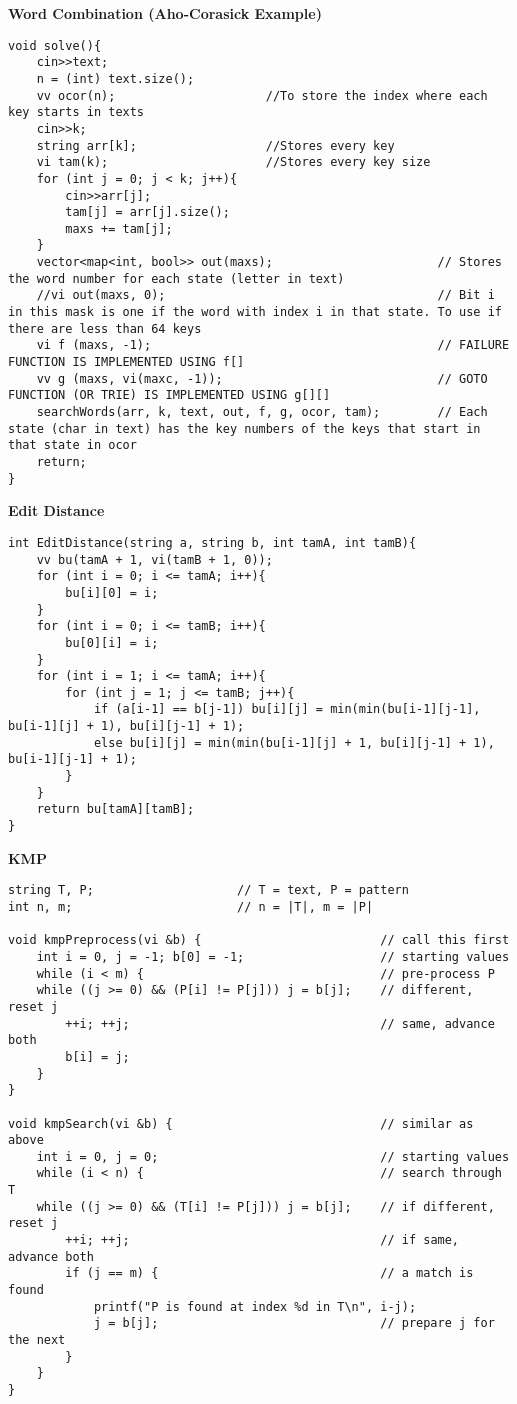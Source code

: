\documentclass{article}
\begin{document}
\begin{multicols}{2}
\large
\huge\textbf{Word Combination (Aho-Corasick Example)}
\large
\begin{lstlisting}
void solve(){
	cin>>text;
	n = (int) text.size();
	vv ocor(n);                     //To store the index where each key starts in texts
	cin>>k;
	string arr[k];                  //Stores every key
	vi tam(k);                      //Stores every key size
	for (int j = 0; j < k; j++){
		cin>>arr[j];
		tam[j] = arr[j].size();
		maxs += tam[j];
	}
	vector<map<int, bool>> out(maxs);                       // Stores the word number for each state (letter in text)
	//vi out(maxs, 0);                                      // Bit i in this mask is one if the word with index i in that state. To use if there are less than 64 keys
	vi f (maxs, -1);                                        // FAILURE FUNCTION IS IMPLEMENTED USING f[]
	vv g (maxs, vi(maxc, -1));                              // GOTO FUNCTION (OR TRIE) IS IMPLEMENTED USING g[][]
	searchWords(arr, k, text, out, f, g, ocor, tam);        // Each state (char in text) has the key numbers of the keys that start in that state in ocor  
	return;
}
\end{lstlisting}


\large
\huge\textbf{Edit Distance}
\large
\begin{lstlisting}
int EditDistance(string a, string b, int tamA, int tamB){
	vv bu(tamA + 1, vi(tamB + 1, 0));
	for (int i = 0; i <= tamA; i++){
		bu[i][0] = i;
	}
	for (int i = 0; i <= tamB; i++){
		bu[0][i] = i;
	}
	for (int i = 1; i <= tamA; i++){
		for (int j = 1; j <= tamB; j++){
			if (a[i-1] == b[j-1]) bu[i][j] = min(min(bu[i-1][j-1], bu[i-1][j] + 1), bu[i][j-1] + 1);
			else bu[i][j] = min(min(bu[i-1][j] + 1, bu[i][j-1] + 1), bu[i-1][j-1] + 1);
		}
	}
	return bu[tamA][tamB];
}	
\end{lstlisting}

\large
\huge\textbf{KMP}
\large
\begin{lstlisting}
string T, P;                    // T = text, P = pattern
int n, m;                       // n = |T|, m = |P|

void kmpPreprocess(vi &b) {                         // call this first
	int i = 0, j = -1; b[0] = -1;                   // starting values
	while (i < m) {                                 // pre-process P
	while ((j >= 0) && (P[i] != P[j])) j = b[j];    // different, reset j
		++i; ++j;                                   // same, advance both
		b[i] = j;
	}
}

void kmpSearch(vi &b) {                             // similar as above
	int i = 0, j = 0;                               // starting values
	while (i < n) {                                 // search through T
	while ((j >= 0) && (T[i] != P[j])) j = b[j];    // if different, reset j
		++i; ++j;                                   // if same, advance both
		if (j == m) {                               // a match is found
			printf("P is found at index %d in T\n", i-j);
			j = b[j];                               // prepare j for the next
		}
	}
}


\end{lstlisting}
\end{multicols}
\end{document}
